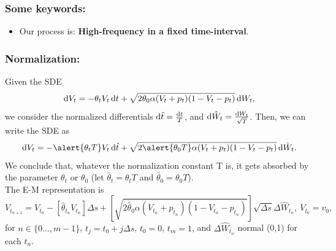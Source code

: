 \documentclass[aspectratio=169]{beamer}\usepackage[utf8]{inputenc}
\begin{document}
\begin{frame}\frametitle{Some keywords:}

\begin{itemize}

\item Our process is: \textbf{High-frequency in a fixed time-interval}.

\end{itemize}

\end{frame}


\begin{frame}\frametitle{Normalization:}\label{Norm}

Given the SDE
\begin{equation*}
\dif V_t=-\theta_tV_t\dif t+\sqrt{2\theta_0\alpha(V_t+p_t)(1-V_t-p_t)}\dif W_t,
\end{equation*}
we consider the normalized differentials $\dif\hat{t}=\frac{\dif t}{T}$, and $\dif\hat{W}_t=\frac{\dif W_t}{\sqrt{T}}$. Then, we can write the SDE as
\begin{equation*}
\dif V_t=-\alert{\theta_tT}V_t\dif\hat{t}+\sqrt{2\alert{\theta_0T}\alpha(V_t+p_t)(1-V_t-p_t)}\dif\hat{W}_t.
\end{equation*}
We conclude that, whatever the normalization constant T is, it gets absorbed by the parameter $\theta_t$ or $\theta_0$ (let $\hat{\theta}_t=\theta_t T$ and $\hat{\theta}_0=\theta_0 T$).
\quad\\
The E-M representation is
\begin{equation*}
V_{t_{n+1}}=V_{t_{n}}-\left[\hat{\theta}_{t_n}V_{t_n}\right]\Delta s+\left[\sqrt{2\hat{\theta}_{0}\alpha(V_{t_n}+p_{t_n})(1-V_{t_n}-p_{t_n})}\right]\sqrt{\Delta s}\Delta\hat{W}_{t_n},\ V_{t_0}=v_0,
\end{equation*}
for $n\in\{0\dots,m-1\}$, $t_j=t_0+j\Delta s$, $t_0=0$, $t_m=1$, and $\Delta\hat{W}_{t_n}$ normal (0,1) for each $t_n$.

\end{frame}
\end{document}
